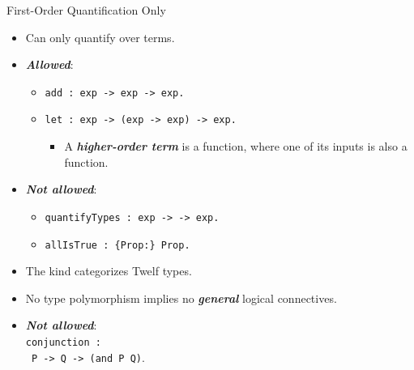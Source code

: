 \documentclass{beamer}
\renewcommand{\emph}[1]{\textbf{\textit{#1}}}
\begin{document}
\begin{frame}{First-Order Quantification Only}
\begin{itemize}
\item Can only quantify over  terms.
\item \emph{Allowed}:
	\begin{itemize}
	\item \texttt{add : exp -> exp -> exp.}
	\item \texttt{let : exp -> (exp -> exp) -> exp.}
	  \begin{itemize}
	  \item A \emph{higher-order term} is a function,
	  where one of its inputs is also a function.
	  \end{itemize}
	\end{itemize}

\pause
\item \emph{Not allowed}:
	\begin{itemize}
  \item \texttt{quantifyTypes : exp ->  -> exp.}
	\item \texttt{allIsTrue : \{Prop:\} Prop.}
	\end{itemize}

\item The kind \texttt{} categorizes Twelf types.

\pause
\item No type polymorphism implies no \emph{general} logical connectives.
\item \emph{Not allowed}: \\
\texttt{conjunction :} \\
\texttt{ P -> Q -> (and P Q)}.
\end{itemize}
\end{frame}
\end{document}
